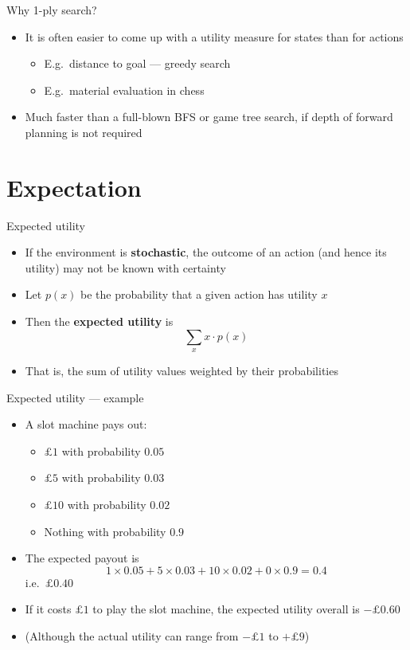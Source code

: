 \begin{frame}{Why 1-ply search?}
    \begin{itemize}
        \pause\item It is often easier to come up with a utility measure for states than for actions
            \begin{itemize}
                \pause\item E.g.\ distance to goal --- greedy search
                \pause\item E.g.\ material evaluation in chess
            \end{itemize}
        \pause\item Much faster than a full-blown BFS or game tree search, if depth of forward planning is not required
    \end{itemize}
\end{frame}

\part{Expectation}
\frame{\partpage}

\begin{frame}{Expected utility}
	\begin{itemize}
        \pause\item If the environment is \textbf{stochastic}, the outcome of an action (and hence its utility)
            may not be known with certainty
		\pause\item Let $p(x)$ be the probability that a given action has utility $x$
		\pause\item Then the \textbf{expected utility} is
            $$ \sum_x x \cdot p(x) $$
        \pause\item That is, the sum of utility values weighted by their probabilities
	\end{itemize}
\end{frame}

\begin{frame}{Expected utility --- example}
	\begin{itemize}
		\pause\item A slot machine pays out:
			\begin{itemize}
				\pause\item $\pounds 1$ with probability $0.05$
				\pause\item $\pounds 5$ with probability $0.03$
				\pause\item $\pounds 10$ with probability $0.02$
				\pause\item Nothing with probability $0.9$
			\end{itemize}
		\pause\item The expected payout is
			$$ 1 \times 0.05 + 5 \times 0.03 + 10 \times 0.02 + 0 \times 0.9
				= 0.4 $$
			i.e.\ $\pounds 0.40$
        \pause\item If it costs $\pounds 1$ to play the slot machine, the expected utility overall is
            $-\pounds 0.60$
        \pause\item (Although the actual utility can range from $-\pounds 1$ to $+\pounds 9$)
	\end{itemize}
\end{frame}

